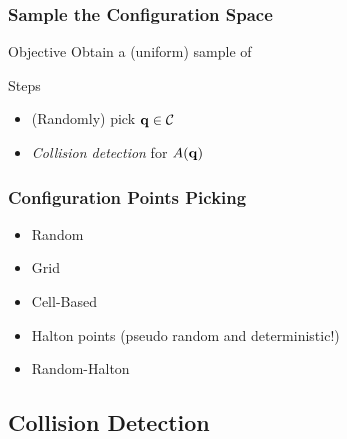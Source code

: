 \documentclass{beamer}
\begin{document}
\begin{frame}
  \frametitle{Sample the Configuration Space}
  \begin{alertblock}{Objective}
    Obtain a (uniform) sample of \cfree{}
  \end{alertblock}
  \begin{block}{Steps}
    \begin{itemize}
    \item (Randomly) pick \(\cp{q} \in \cspace\)
    \item \emph{Collision detection} for \(\robot(\cp{q})\)
    \end{itemize}
  \end{block}
\end{frame}

\begin{frame}[allowframebreaks,label=main-cspace-pts-pick]
  \frametitle{Configuration Points Picking}
  \begin{itemize}
  \item Random
  \item Grid
  \item Cell-Based
  \item Halton points (pseudo random and deterministic!)~\hyperlink{app-halton}{}
  \item Random-Halton
  \end{itemize}
\end{frame}

\subsection*{Collision Detection}

\end{document}
